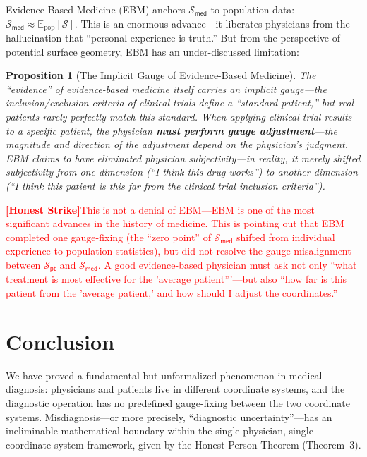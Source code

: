 \documentclass[12pt,a4paper]{article}
\newtheorem{proposition}[theorem]{Proposition}
\theoremstyle{remark}
\newcommand{\med}{\textsf{med}}
\newcommand{\pt}{\textsf{pt}}
\newcommand{\honestcrit}[1]{%
    \textcolor{red}{\textbf{[Honest Strike]}#1}%
}
\begin{document}
Evidence-Based Medicine (EBM) anchors $\mathcal{S}_{\med}$ to population data: $\mathcal{S}_{\med} \approx \mathbb{E}_{\text{pop}}[\mathcal{S}]$. This is an enormous advance---it liberates physicians from the hallucination that ``personal experience is truth.'' But from the perspective of potential surface geometry, EBM has an under-discussed limitation:

\begin{proposition}[The Implicit Gauge of Evidence-Based Medicine]\label{prop:ebm_gauge}
The ``evidence'' of evidence-based medicine itself carries an implicit gauge---the inclusion/exclusion criteria of clinical trials define a ``standard patient,'' but real patients rarely perfectly match this standard. When applying clinical trial results to a specific patient, the physician \textbf{must perform gauge adjustment}---the magnitude and direction of the adjustment depend on the physician's judgment. EBM claims to have eliminated physician subjectivity---in reality, it merely shifted subjectivity from one dimension (``I think this drug works'') to another dimension (``I think this patient is this far from the clinical trial inclusion criteria'').
\end{proposition}

\honestcrit{This is not a denial of EBM---EBM is one of the most significant advances in the history of medicine. This is pointing out that EBM completed one gauge-fixing (the ``zero point'' of $\mathcal{S}_{\med}$ shifted from individual experience to population statistics), but did not resolve the gauge misalignment between $\mathcal{S}_{\pt}$ and $\mathcal{S}_{\med}$. A good evidence-based physician must ask not only ``what treatment is most effective for the 'average patient'''---but also ``how far is this patient from the 'average patient,' and how should I adjust the coordinates.''}

\section{Conclusion}
\label{sec:conclusion}

We have proved a fundamental but unformalized phenomenon in medical diagnosis: physicians and patients live in different coordinate systems, and the diagnostic operation has no predefined gauge-fixing between the two coordinate systems. Misdiagnosis---or more precisely, ``diagnostic uncertainty''---has an ineliminable mathematical boundary within the single-physician, single-coordinate-system framework, given by the Honest Person Theorem (Theorem~3).
\end{document}
